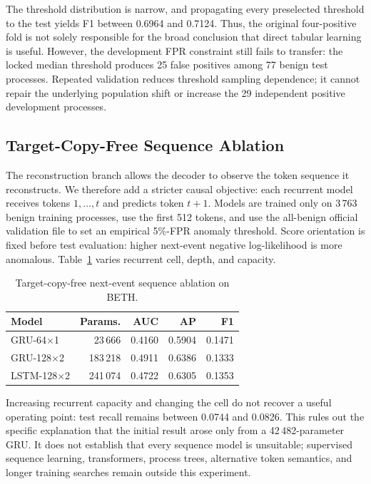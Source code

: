 \documentclass[10pt,journal,compsoc]{IEEEtran}
\begin{document}
The threshold distribution is narrow, and propagating every preselected threshold to the test yields F1 between 0.6964 and 0.7124. Thus, the original four-positive fold is not solely responsible for the broad conclusion that direct tabular learning is useful. However, the development FPR constraint still fails to transfer: the locked median threshold produces 25 false positives among 77 benign test processes. Repeated validation reduces threshold sampling dependence; it cannot repair the underlying population shift or increase the 29 independent positive development processes.

\subsection{Target-Copy-Free Sequence Ablation}
\label{sec:sequence_ablation}

The reconstruction branch allows the decoder to observe the token sequence it reconstructs. We therefore add a stricter causal objective: each recurrent model receives tokens $1,\ldots,t$ and predicts token $t+1$. Models are trained only on 3\,763 benign training processes, use the first 512 tokens, and use the all-benign official validation file to set an empirical 5\%-FPR anomaly threshold. Score orientation is fixed before test evaluation: higher next-event negative log-likelihood is more anomalous. Table~\ref{tab:sequence_ablation} varies recurrent cell, depth, and capacity.

\begin{table}[t]
\centering
\caption{Target-copy-free next-event sequence ablation on BETH.}
\label{tab:sequence_ablation}
\begin{tabular}{lrrrr}
\toprule
\textbf{Model} & \textbf{Params.} & \textbf{AUC} & \textbf{AP} & \textbf{F1} \\
\midrule
GRU-64$\times$1 & 23\,666 & 0.4160 & 0.5904 & 0.1471 \\
GRU-128$\times$2 & 183\,218 & 0.4911 & 0.6386 & 0.1333 \\
LSTM-128$\times$2 & 241\,074 & 0.4722 & 0.6305 & 0.1353 \\
\bottomrule
\end{tabular}
\end{table}

Increasing recurrent capacity and changing the cell do not recover a useful operating point: test recall remains between 0.0744 and 0.0826. This rules out the specific explanation that the initial result arose only from a 42\,482-parameter GRU. It does not establish that every sequence model is unsuitable; supervised sequence learning, transformers, process trees, alternative token semantics, and longer training searches remain outside this experiment.
\end{document}
